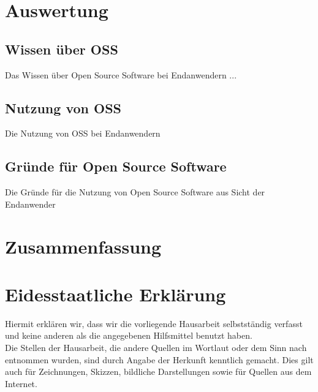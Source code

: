 \documentclass[a4paper]{article}
\begin{document}
    \section{Auswertung}
        \subsection{Wissen über OSS}
            Das Wissen über Open Source Software bei Endanwendern ...
                
        \subsection{Nutzung von OSS}
            Die Nutzung von OSS bei Endanwendern
        
        \subsection{Gründe für Open Source Software}
            Die Gründe für die Nutzung von Open Source Software aus Sicht der Endanwender
    
    \section{Zusammenfassung}
    
    \section{Eidesstaatliche Erklärung}
        Hiermit erklären wir, dass wir die vorliegende Hausarbeit selbstständig verfasst und keine anderen als die angegebenen Hilfsmittel benutzt haben.\\
        Die Stellen der Hausarbeit, die andere Quellen im Wortlaut oder dem Sinn nach entnommen wurden, sind durch Angabe der Herkunft kenntlich gemacht. Dies gilt auch für Zeichnungen, Skizzen, bildliche Darstellungen sowie für Quellen aus dem Internet.
        
\end{document}
